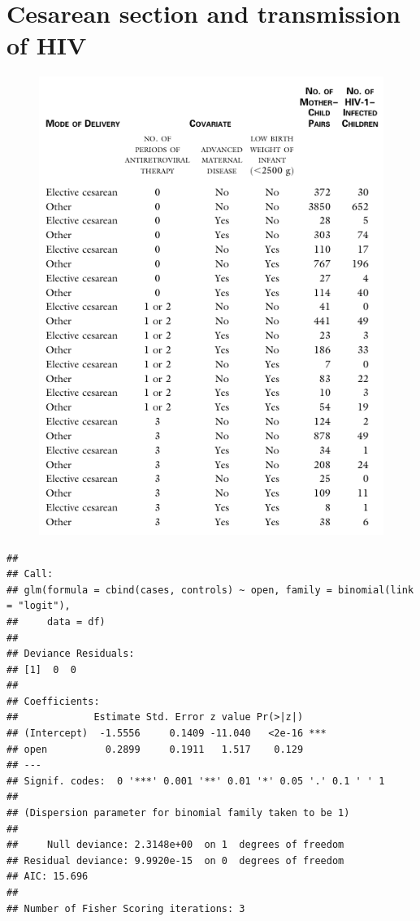\documentclass[landscape,twocolumn,letterpaper,9pt,reqno]{article}\usepackage[]{graphicx}\usepackage[]{color}
\newenvironment{knitrout}{}{} %
\begin{document}
	


\section{Cesarean section and transmission of HIV}

\begin{figure}[h]
	\centering
	\includegraphics[scale=0.99]{hivtable.pdf}
\end{figure}


\begin{knitrout}
\color{fgcolor}
\begin{verbatim}
## 
## Call:
## glm(formula = cbind(cases, controls) ~ open, family = binomial(link = "logit"), 
##     data = df)
## 
## Deviance Residuals: 
## [1]  0  0
## 
## Coefficients:
##             Estimate Std. Error z value Pr(>|z|)    
## (Intercept)  -1.5556     0.1409 -11.040   <2e-16 ***
## open          0.2899     0.1911   1.517    0.129    
## ---
## Signif. codes:  0 '***' 0.001 '**' 0.01 '*' 0.05 '.' 0.1 ' ' 1
## 
## (Dispersion parameter for binomial family taken to be 1)
## 
##     Null deviance: 2.3148e+00  on 1  degrees of freedom
## Residual deviance: 9.9920e-15  on 0  degrees of freedom
## AIC: 15.696
## 
## Number of Fisher Scoring iterations: 3
\end{verbatim}

\end{knitrout}
\end{document}
